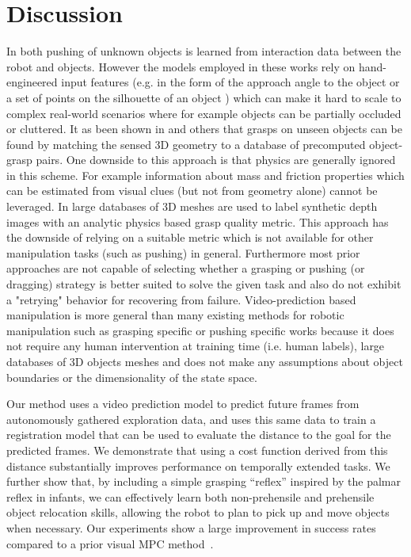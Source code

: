 \section{Discussion}

In both \cite{hermans2013learning,salganicoff1993vision} pushing of unknown objects is learned from interaction data between the robot and objects. However the models employed in these works rely on hand-engineered input features (e.g. in the form of the approach angle to the object \cite{salganicoff1993vision} or a set of points on the silhouette of an object \cite{hermans2013learning}) which can make it hard to scale to complex real-world scenarios where for example objects can be partially occluded or cluttered. 
It as been shown in \cite{goldfeder2009data} and others that grasps on unseen objects can be found by matching the sensed 3D geometry to a database of precomputed object-grasp pairs. One downside to this approach is that physics are generally ignored in this scheme. For example information about mass and friction properties which can be estimated from visual clues (but not from geometry alone) cannot be leveraged. In \cite{mahler2017dex} large databases of 3D meshes are used to label synthetic depth images with an analytic physics based grasp quality metric. This approach has the downside of relying on a suitable metric which is not available for other manipulation tasks (such as pushing) in general.
Furthermore most prior approaches are not capable of selecting whether a grasping or pushing (or dragging) strategy is better suited to solve the given task and also do not exhibit a "retrying" behavior for recovering from failure.
Video-prediction based manipulation is more general than many existing methods for robotic manipulation such as grasping specific \cite{lenz2015deep, goldfeder2009data, zeng2017robotic} or pushing specific works \cite{hermans2013learning, salganicoff1993vision} because it does not require any human intervention at training time (i.e. human labels), large databases of 3D objects meshes and does not make any assumptions about object boundaries or the dimensionality of the state space.

Our method uses a video prediction model to predict future frames from autonomously gathered exploration data, and uses this same data to train a registration model that can be used to evaluate the distance to the goal for the predicted frames. We demonstrate that using a cost function derived from this distance substantially improves performance on temporally extended tasks. We further show that, by including a simple grasping ``reflex'' inspired by the palmar reflex in infants, we can effectively learn both non-prehensile and prehensile object relocation skills, allowing the robot to plan to pick up and move objects when necessary. Our experiments show a large improvement in success rates compared to a prior visual MPC method~\cite{sna}.
